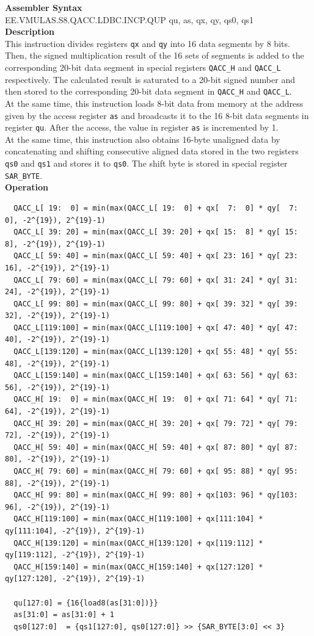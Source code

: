 \textbf{Assembler Syntax} \\
EE.VMULAS.S8.QACC.LDBC.INCP.QUP qu, as, qx, qy, qs0, qs1 \\
\textbf{Description} \\
This instruction divides registers \lstinline{qx} and \lstinline{qy} into 16 data segments by 8 bits. Then, the signed multiplication result of the 16 sets of segments is added to the corresponding 20-bit data segment in special registers \lstinline{QACC_H} and \lstinline{QACC_L} respectively. The calculated result is saturated to a 20-bit signed number and then stored to the corresponding 20-bit data segment in \lstinline{QACC_H} and \lstinline{QACC_L}.\\
At the same time, this instruction loads 8-bit data from memory at the address given by the access register \lstinline{as} and broadcasts it to the 16 8-bit data segments in register \lstinline{qu}. After the access, the value in register \lstinline{as} is incremented by 1.\\
At the same time, this instruction also obtains 16-byte unaligned data by concatenating and shifting consecutive aligned data stored in the two registers \lstinline{qs0} and \lstinline{qs1} and stores it to \lstinline{qs0}. The shift byte is stored in special register \lstinline{SAR_BYTE}.\\
\textbf{Operation}
\begin{lstlisting}
  QACC_L[ 19:  0] = min(max(QACC_L[ 19:  0] + qx[  7:  0] * qy[  7:  0], -2^{19}), 2^{19}-1)
  QACC_L[ 39: 20] = min(max(QACC_L[ 39: 20] + qx[ 15:  8] * qy[ 15:  8], -2^{19}), 2^{19}-1)
  QACC_L[ 59: 40] = min(max(QACC_L[ 59: 40] + qx[ 23: 16] * qy[ 23: 16], -2^{19}), 2^{19}-1)
  QACC_L[ 79: 60] = min(max(QACC_L[ 79: 60] + qx[ 31: 24] * qy[ 31: 24], -2^{19}), 2^{19}-1)
  QACC_L[ 99: 80] = min(max(QACC_L[ 99: 80] + qx[ 39: 32] * qy[ 39: 32], -2^{19}), 2^{19}-1)
  QACC_L[119:100] = min(max(QACC_L[119:100] + qx[ 47: 40] * qy[ 47: 40], -2^{19}), 2^{19}-1)
  QACC_L[139:120] = min(max(QACC_L[139:120] + qx[ 55: 48] * qy[ 55: 48], -2^{19}), 2^{19}-1)
  QACC_L[159:140] = min(max(QACC_L[159:140] + qx[ 63: 56] * qy[ 63: 56], -2^{19}), 2^{19}-1)
  QACC_H[ 19:  0] = min(max(QACC_H[ 19:  0] + qx[ 71: 64] * qy[ 71: 64], -2^{19}), 2^{19}-1)
  QACC_H[ 39: 20] = min(max(QACC_H[ 39: 20] + qx[ 79: 72] * qy[ 79: 72], -2^{19}), 2^{19}-1)
  QACC_H[ 59: 40] = min(max(QACC_H[ 59: 40] + qx[ 87: 80] * qy[ 87: 80], -2^{19}), 2^{19}-1)
  QACC_H[ 79: 60] = min(max(QACC_H[ 79: 60] + qx[ 95: 88] * qy[ 95: 88], -2^{19}), 2^{19}-1)
  QACC_H[ 99: 80] = min(max(QACC_H[ 99: 80] + qx[103: 96] * qy[103: 96], -2^{19}), 2^{19}-1)
  QACC_H[119:100] = min(max(QACC_H[119:100] + qx[111:104] * qy[111:104], -2^{19}), 2^{19}-1)
  QACC_H[139:120] = min(max(QACC_H[139:120] + qx[119:112] * qy[119:112], -2^{19}), 2^{19}-1)
  QACC_H[159:140] = min(max(QACC_H[159:140] + qx[127:120] * qy[127:120], -2^{19}), 2^{19}-1)

  qu[127:0] = {16{load8(as[31:0])}}
  as[31:0] = as[31:0] + 1
  qs0[127:0]  = {qs1[127:0], qs0[127:0]} >> {SAR_BYTE[3:0] << 3}
\end{lstlisting}


